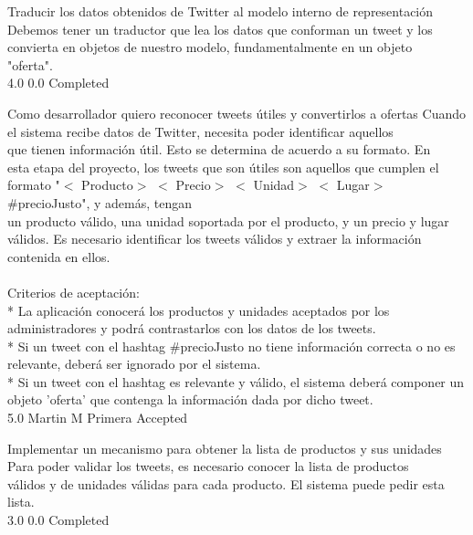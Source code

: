 		{Traducir los datos obtenidos de Twitter al modelo interno de representación} %
		{Debemos tener un traductor que lea los datos que conforman un tweet y los\\
convierta en objetos de nuestro modelo, fundamentalmente en un objeto\\
"oferta".\\
} %
		{4.0} %
		{} %
		{0.0} %
		{Completed} %


\vspace{20pt}

	{Como desarrollador quiero reconocer tweets útiles y convertirlos a ofertas} %
	{Cuando el sistema recibe datos de Twitter, necesita poder identificar aquellos\\
que tienen información útil. Esto se determina de acuerdo a su formato. En\\
esta etapa del proyecto, los tweets que son útiles son aquellos que cumplen el\\
formato "$<$ Producto$>$  $<$ Precio$>$  $<$ Unidad$>$  $<$ Lugar$>$  #precioJusto", y además, tengan\\
un producto válido, una unidad soportada por el producto, y un precio y lugar\\
válidos. Es necesario identificar los tweets válidos y extraer la información\\
contenida en ellos.\\
  \\
Criterios de aceptación:\\
* La aplicación conocerá los productos y unidades aceptados por los administradores y podrá contrastarlos con los datos de los tweets.  \\
* Si un tweet con el hashtag #precioJusto no tiene información correcta o no es relevante, deberá ser ignorado por el sistema.  \\
* Si un tweet con el hashtag es relevante y válido, el sistema deberá componer un objeto 'oferta' que contenga la información dada por dicho tweet.\\
} %
	{} %
	{5.0} %
	{Martin M} %
	{Primera} %
	{Accepted} %

		{Implementar un mecanismo para obtener la lista de productos y sus unidades} %
		{Para poder validar los tweets, es necesario conocer la lista de productos\\
válidos y de unidades válidas para cada producto. El sistema puede pedir esta\\
lista.\\
} %
		{3.0} %
		{} %
		{0.0} %
		{Completed} %

